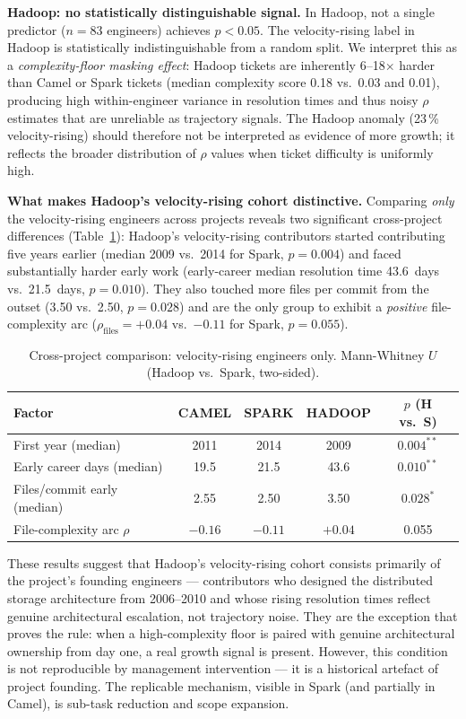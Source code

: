 \documentclass[12pt,a4paper]{article}
\begin{document}
\textbf{Hadoop: no statistically distinguishable signal.}
In Hadoop, not a single predictor ($n = 83$ engineers) achieves $p < 0.05$.
The velocity-rising label in Hadoop is statistically indistinguishable
from a random split.
We interpret this as a \textit{complexity-floor masking effect}:
Hadoop tickets are inherently 6--18$\times$ harder than
Camel or Spark tickets (median complexity score 0.18 vs.\ 0.03 and 0.01),
producing high within-engineer variance in resolution times and thus
noisy $\rho$ estimates that are unreliable as trajectory signals.
The Hadoop anomaly (23\,\% velocity-rising) should therefore not be
interpreted as evidence of more growth; it reflects the broader
distribution of $\rho$ values when ticket difficulty is uniformly high.

\textbf{What makes Hadoop's velocity-rising cohort distinctive.}
Comparing \textit{only} the velocity-rising engineers across projects
reveals two significant cross-project differences
(Table~\ref{tab:growth_cross}): Hadoop's velocity-rising contributors
started contributing five years earlier (median 2009 vs.\ 2014 for Spark,
$p = 0.004$) and faced substantially harder early work
(early-career median resolution time 43.6~days vs.\ 21.5~days,
$p = 0.010$).
They also touched more files per commit from the outset
(3.50 vs.\ 2.50, $p = 0.028$) and are the only group to exhibit a
\textit{positive} file-complexity arc
($\rho_{\text{files}} = +0.04$ vs.\ $-0.11$ for Spark, $p = 0.055$).

\begin{table}[h]
\centering
\caption{Cross-project comparison: velocity-rising engineers only.
Mann-Whitney $U$ (Hadoop vs.\ Spark, two-sided).}
\label{tab:growth_cross}
\begin{tabular}{lcccc}
\toprule
Factor & CAMEL & SPARK & HADOOP & $p$ (H vs.\ S) \\
\midrule
First year (median)           & 2011  & 2014   & 2009  & $0.004^{**}$ \\
Early career days (median)    & 19.5  & 21.5   & 43.6  & $0.010^{**}$ \\
Files/commit early (median)   & 2.55  & 2.50   & 3.50  & $0.028^{*}$  \\
File-complexity arc $\rho$    & $-0.16$ & $-0.11$ & $+0.04$ & 0.055 \\
\bottomrule
\end{tabular}
\end{table}

These results suggest that Hadoop's velocity-rising cohort consists
primarily of the project's founding engineers --- contributors who
designed the distributed storage architecture from 2006--2010 and
whose rising resolution times reflect genuine architectural escalation,
not trajectory noise.
They are the exception that proves the rule: when a high-complexity
floor is paired with genuine architectural ownership from day one,
a real growth signal is present.
However, this condition is not reproducible by management intervention
--- it is a historical artefact of project founding.
The replicable mechanism, visible in Spark (and partially in Camel),
is sub-task reduction and scope expansion.
\end{document}
